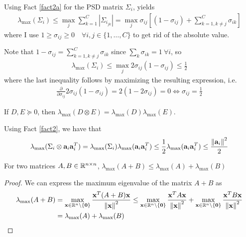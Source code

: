 \documentclass{article}
\begin{document}
\begin{enumerate}[label=1.I.\arabic*]
    Using Fact \ref{fact2a} for the PSD matrix $\Sigma_i$, yields
    \begin{align}
        \lambda_{\max} (\Sigma_i) \leq \max_j \sum_{k=1}^C |\Sigma_{i_{jk}}|  = \max_j \sigma_{ij} \left[(1-\sigma_{ij})+\sum_{k=1, k\neq j}^C \sigma_{ik} \right]
    \end{align}
    where I use $1 \geq \sigma_{ij} \geq 0 \quad \forall i,j \in \{1,\dots, C\}$ to get rid of the absolute value.
    
    Note that $1-\sigma_{ij}=\sum_{k=1, k\neq j}^C \sigma_{ik}$ since $\sum_k \sigma_{ik}=1\ \forall i$, so
    \begin{align}
        \lambda_{\max} (\Sigma_i) \leq \max_j 2 \sigma_{ij} (1-\sigma_{ij}) \leq \frac{1}{2}
    \end{align}
    where the last inequality follows by maximizing the resulting expression, i.e.
    \begin{align}
        \frac{\partial}{\partial \sigma_{ij}} 2 \sigma_{ij} (1-\sigma_{ij}) = 2(1- 2 \sigma_{ij}) = 0 \Longleftrightarrow \sigma_{ij} = \frac{1}{2}
    \end{align}
    
    \begin{fact}
        If $D, E \succeq 0$, then $\lambda_{\max}(D \otimes E) = \lambda_{\max}(D)\lambda_{\max}(E)$.
        \label{fact2}
    \end{fact}
    
    Using Fact \ref{fact2}, we have that
    \begin{align}
         \lambda_{\max} (\Sigma_i \otimes \mathbf{a}_i \mathbf{a}_i^T) = \lambda_{\max} (\Sigma_i ) \lambda_{\max}(\mathbf{a}_i \mathbf{a}_i^T) \leq \frac{1}{2}\lambda_{\max}(\mathbf{a}_i \mathbf{a}_i^T) \leq \frac{\left\lVert\mathbf{a}_i\right\rVert^2}{2}
    \end{align}
    
    \begin{lemma}
        For two matrices $A, B \in \mathbb{R}^{n\times n}$, $\lambda_{\max}(A+B)\leq \lambda_{\max}(A)+\lambda_{\max}(B)$
        \label{lemma:1}
    \end{lemma}
    \begin{proof}
        We can express the maximum eigenvalue of the matrix $A+B$ as
        \begin{align}
            \lambda_{\max}(A+B)&=\max_{\mathbf{x} \in \mathbb{R}^n\setminus\{\mathbf{0}\} }\frac{\mathbf{x} ^T (A+B)\mathbf{x}}{\left\lVert\mathbf{x}\right\rVert^2} \leq \max_{\mathbf{x} \in \mathbb{R}^n \setminus\{\mathbf{0}\}}\frac{\mathbf{x} ^T A\mathbf{x}}{\left\lVert\mathbf{x}\right\rVert^2}+\max_{\mathbf{x} \in \mathbb{R}^n\setminus\{\mathbf{0}\} }\frac{\mathbf{x} ^T B\mathbf{x}}{\left\lVert\mathbf{x}\right\rVert^2}\\
            &=\lambda_{\max}(A)+\lambda_{\max}(B)
        \end{align}
    \end{proof}
    

\end{enumerate}
\end{document}
